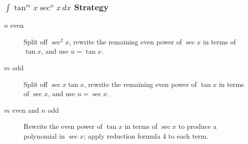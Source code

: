 \subsubsection{$\int \tan^m x \sec^n x \, dx$ Strategy}
\begin{description}
\item [$n$ even] Split off $\sec^2 x$, rewrite the remaining even power of $\sec x$ in terms of $\tan x$, and use $u = \tan x$.
\item [$m$ odd] Split off $\sec x \tan x$, rewrite the remaining even power of $\tan x$ in terms of $\sec x$, and use $u = \sec x$.
\item [$m$ even and $n$ odd] Rewrite the even power of $\tan x$ in terms of $\sec x$ to produce a polynomial in $\sec x$; apply reduction formula 4 to each term.
\end{description}
